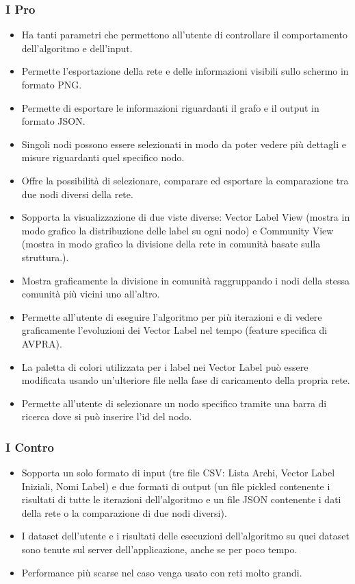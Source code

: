 \documentclass[a4paper,12pt]{report}
\begin{document}
			\subsubsection*{I Pro}
				\begin{itemize}
					\item Ha tanti parametri che permettono all'utente di controllare il comportamento dell'algoritmo e dell'input.
					\item Permette l'esportazione della rete e delle informazioni visibili sullo schermo in formato PNG.
					\item Permette di esportare le informazioni riguardanti il grafo e il output in formato JSON.
					\item Singoli nodi possono essere selezionati in modo da poter vedere più dettagli e misure riguardanti quel specifico nodo.
					\item Offre la possibilità di selezionare, comparare ed esportare la comparazione tra due nodi diversi della rete.
					\item Sopporta la visualizzazione di due viste diverse: Vector Label View (mostra in modo grafico la distribuzione delle label su ogni nodo) e Community View (mostra in modo grafico la divisione della rete in comunità basate sulla struttura.).
					\item Mostra graficamente la divisione in comunità raggruppando i nodi della stessa comunità più vicini uno all'altro.
					\item Permette all'utente di eseguire l'algoritmo per più iterazioni e di vedere graficamente l'evoluzioni dei Vector Label nel tempo (feature specifica di AVPRA).
					\item La paletta di colori utilizzata per i label nei Vector Label può essere modificata usando un'ulteriore file nella fase di caricamento della propria rete.
					\item Permette all'utente di selezionare un nodo specifico tramite una barra di ricerca dove si può inserire l'id del nodo.
				\end{itemize}
						
			\subsubsection*{I Contro}
				\begin{itemize}
					\item Sopporta un solo formato di input (tre file CSV: Lista Archi, Vector Label Iniziali, Nomi Label) e due formati di output (un file pickled contenente i risultati di tutte le iterazioni dell'algoritmo e un file JSON contenente i dati della rete o la comparazione di due nodi diversi).
					\item I dataset dell'utente e i risultati delle esecuzioni dell'algoritmo su quei dataset sono tenute sul server dell'applicazione, anche se per poco tempo.
					\item Performance più scarse nel caso venga usato con reti molto grandi.
				\end{itemize}
\end{document}
